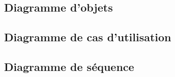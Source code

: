 \documentclass[12pt, a4paper]{report}
\begin{document}
    \subsection{Diagramme d'objets}\label{subsec:objects-diagram}
    

    \subsection{Diagramme de cas d'utilisation}\label{subsec:use-case-diagram}
    

    \subsection{Diagramme de séquence}\label{subsec:sequence-diagram}
    
\end{document}
